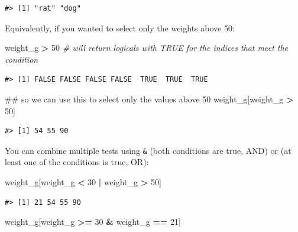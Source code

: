 \documentclass[]{book}
\newenvironment{Shaded}{\begin{snugshade}}{\end{snugshade}}
\newcommand{\DecValTok}[1]{\textcolor[rgb]{0.00,0.00,0.81}{#1}}
\newcommand{\StringTok}[1]{\textcolor[rgb]{0.31,0.60,0.02}{#1}}
\newcommand{\CommentTok}[1]{\textcolor[rgb]{0.56,0.35,0.01}{\textit{#1}}}
\newcommand{\OperatorTok}[1]{\textcolor[rgb]{0.81,0.36,0.00}{\textbf{#1}}}
\newcommand{\NormalTok}[1]{#1}
\theoremstyle{definition}
\theoremstyle{definition}
\theoremstyle{definition}
\theoremstyle{remark}
\begin{document}
\begin{verbatim}
#> [1] "rat" "dog"
\end{verbatim}

Equivalently, if you wanted to select only the weights above 50:

\begin{Shaded}
\begin{Highlighting}[]
\NormalTok{weight_g }\OperatorTok{>}\StringTok{ }\DecValTok{50}    \CommentTok{# will return logicals with TRUE for the indices that meet the condition}
\end{Highlighting}
\end{Shaded}

\begin{verbatim}
#> [1] FALSE FALSE FALSE FALSE  TRUE  TRUE  TRUE
\end{verbatim}

\begin{Shaded}
\begin{Highlighting}[]
\NormalTok{## so we can use this to select only the values above 50}
\NormalTok{weight_g[weight_g }\OperatorTok{>}\StringTok{ }\DecValTok{50}\NormalTok{]}
\end{Highlighting}
\end{Shaded}

\begin{verbatim}
#> [1] 54 55 90
\end{verbatim}

You can combine multiple tests using \texttt{\&} (both conditions are
true, AND) or \texttt{\textbar{}} (at least one of the conditions is
true, OR):

\begin{Shaded}
\begin{Highlighting}[]
\NormalTok{weight_g[weight_g }\OperatorTok{<}\StringTok{ }\DecValTok{30} \OperatorTok{|}\StringTok{ }\NormalTok{weight_g }\OperatorTok{>}\StringTok{ }\DecValTok{50}\NormalTok{]}
\end{Highlighting}
\end{Shaded}

\begin{verbatim}
#> [1] 21 54 55 90
\end{verbatim}

\begin{Shaded}
\begin{Highlighting}[]
\NormalTok{weight_g[weight_g }\OperatorTok{>=}\StringTok{ }\DecValTok{30} \OperatorTok{&}\StringTok{ }\NormalTok{weight_g }\OperatorTok{==}\StringTok{ }\DecValTok{21}\NormalTok{]}
\end{Highlighting}
\end{Shaded}
\end{document}
